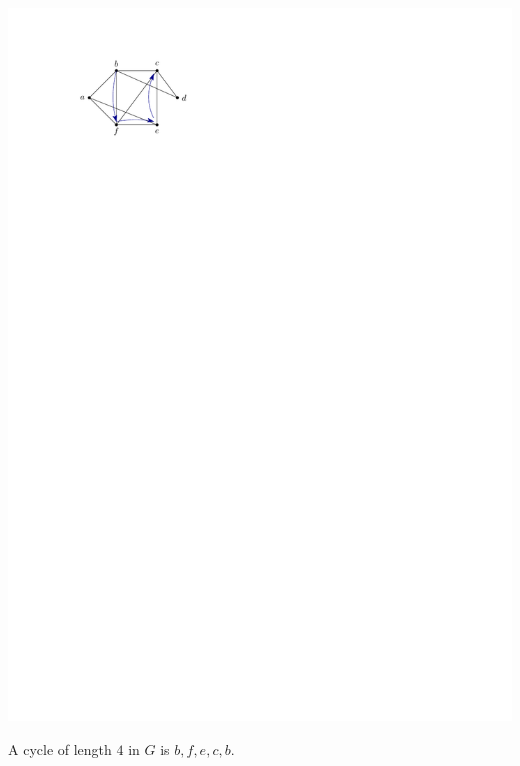 \begin{Example}
\begin{center}
\includegraphics{Path1.pdf}
\end{center}
A cycle of length $4$ in $G$ is $b, f, e, c, b$.


\end{Example}
